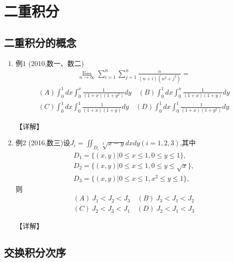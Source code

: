 \documentclass[12pt, a4paper, oneside, UTF8]{ctexbook}
\begin{document}
\section{二重积分}
\subsection{二重积分的概念}

\begin{enumerate}[label=\arabic*.]
    \item 例1 (2010,数一、数二) 
    \begin{align*}
        \lim_{n\rightarrow\infty}\sum_{i=1}^n\sum_{j=1}^n\frac{n}{(n+i)(n^2+j^2)}=
    \end{align*}
    \begin{align*}
        (A)\int_0^1 dx\int_0^x\frac{1}{(1+x)(1+y^2)}dy \quad (B)\int_0^1 dx\int_0^x\frac{1}{(1+x)(1+y)}dy \\
        (C)\int_0^1 dx\int_0^1\frac{1}{(1+x)(1+y)}dy \quad (D)\int_0^1 dx\int_0^1\frac{1}{(1+x)(1+y^2)}dy
    \end{align*}
    
    \begin{solution}
    【详解】
    \end{solution}
    
    \item 例2 (2016,数三)设$J_i=\iint_{D_i}\sqrt[3]{x-y}dxdy(i=1,2,3)$,其中
    \begin{align*}
        D_1=\{(x,y)|0\leq x\leq 1,0\leq y\leq 1\}, \\
        D_2=\{(x,y)|0\leq x\leq 1,0\leq y\leq \sqrt{x}\}, \\
        D_3=\{(x,y)|0\leq x\leq 1,x^2\leq y\leq 1\},
    \end{align*}
    则
    \begin{align*}
        (A)\ J_1<J_2<J_3 \quad (B)\ J_3<J_1<J_2 \\
        (C)\ J_2<J_3<J_1 \quad (D)\ J_2<J_1<J_3
    \end{align*}
    
    \begin{solution}
    【详解】
    \end{solution}
\end{enumerate}

\subsection{交换积分次序}
\end{document}

